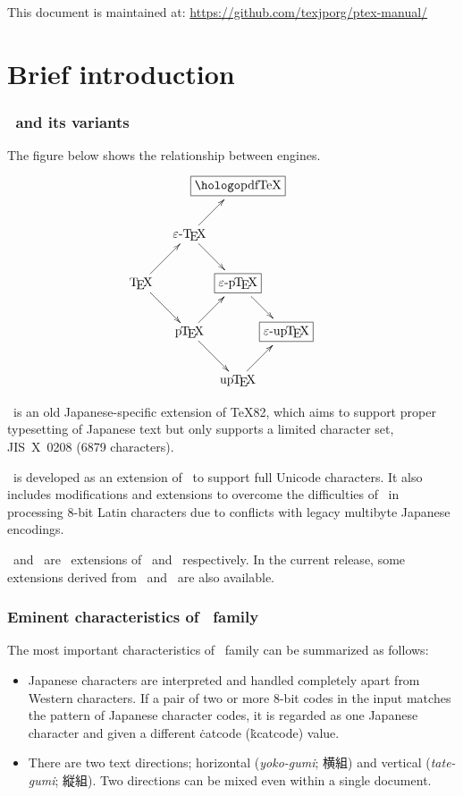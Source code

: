 \documentclass[a4paper,11pt,dvipdfmx]{article}
\def\Foreign#1{\textit{#1}}
\begin{document}
This document is maintained at:
\url{https://github.com/texjporg/ptex-manual/}

\tableofcontents


\newpage


\part{Brief introduction}%

\section{\pTeX\ and its variants}

The figure below shows the relationship between engines.
\[
\xymatrix@ur{
 \text{\TeX}   \ar[r]\ar[d] & \text{\eTeX}  \ar[r]\ar[d]
   & \text{\fbox{\pdfTeX}} \\
 \text{\pTeX}  \ar[r]\ar[d] & \text{\fbox{\epTeX}} \ar[d] &\\
 \text{\upTeX} \ar[r]       & \text{\fbox{\eupTeX}}       &
}
\]

\pTeX\ is an old Japanese-specific extension of \TeX82,
which aims to support proper typesetting of Japanese text
but only supports a limited character set, JIS~X~0208 (6879 characters).

\upTeX\ is developed as an extension of \pTeX\ to support full Unicode
characters. It also includes modifications and extensions to overcome
the difficulties of \pTeX\ in processing 8-bit Latin characters
due to conflicts with legacy multibyte Japanese encodings.

\epTeX\ and \eupTeX\ are \eTeX\ extensions of \pTeX\ and \upTeX\ respectively.
In the current release, some extensions derived from \pdfTeX\ and \OMEGA\ are
also available.

\section{Eminent characteristics of \pTeX\ family}

The most important characteristics of \pTeX\ family can be
summarized as follows:
\begin{itemize}
  \item Japanese characters are interpreted and handled completely apart from
    Western characters. If a pair of two or more 8-bit codes in the input
    matches the pattern of Japanese character codes, it is regarded as one
    Japanese character and given a different \.{catcode} (\.{kcatcode}) value.
  \item There are two text directions; horizontal (\Foreign{yoko-gumi}; 横組)
    and vertical (\Foreign{tate-gumi}; 縦組).
    Two directions can be mixed even within a single document.
\end{itemize}
\end{document}
